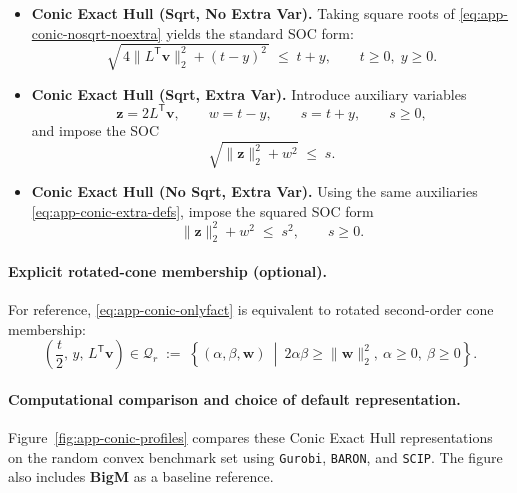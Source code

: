 \documentclass[11pt]{article}
\begin{document}
\begin{appendices}
\begin{itemize}
\item \textbf{Conic Exact Hull (Sqrt, No Extra Var).}
Taking square roots of \eqref{eq:app-conic-nosqrt-noextra} yields the standard SOC form:
\begin{equation}
\label{eq:app-conic-sqrt-noextra}
\sqrt{\,4\|L^{\mathsf T}\mathbf{v}\|_2^2 + (t-y)^2\,} \;\le\; t+y,
\qquad t\ge 0,\; y\ge 0.
\end{equation}

\item \textbf{Conic Exact Hull (Sqrt, Extra Var).}
Introduce auxiliary variables
\begin{equation}
\label{eq:app-conic-extra-defs}
\mathbf{z} = 2L^{\mathsf T}\mathbf{v},
\qquad
w = t-y,
\qquad
s = t+y,
\qquad
s \ge 0,
\end{equation}
and impose the SOC
\begin{equation}
\label{eq:app-conic-sqrt-extra}
\sqrt{\|\mathbf{z}\|_2^2 + w^2} \;\le\; s.
\end{equation}

\item \textbf{Conic Exact Hull (No Sqrt, Extra Var).}
Using the same auxiliaries \eqref{eq:app-conic-extra-defs}, impose the squared SOC form
\begin{equation}
\label{eq:app-conic-nosqrt-extra}
\|\mathbf{z}\|_2^2 + w^2 \;\le\; s^2,
\qquad s\ge 0.
\end{equation}
\end{itemize}

\paragraph{Explicit rotated-cone membership (optional).}
For reference, \eqref{eq:app-conic-onlyfact} is equivalent to rotated second-order cone membership:
\[
\left(\frac{t}{2},\, y,\, L^{\mathsf T}\mathbf{v}\right)\in\mathcal{Q}_r
\;:=\;
\left\{(\alpha,\beta,\mathbf{w}) \ \middle|\ 2\alpha\beta \ge \|\mathbf{w}\|_2^2,\ \alpha\ge 0,\ \beta\ge 0\right\}.
\]

\paragraph{Computational comparison and choice of default representation.}
Figure~\ref{fig:app-conic-profiles} compares these Conic Exact Hull representations on the random convex
benchmark set using \texttt{Gurobi}, \texttt{BARON}, and \texttt{SCIP}. The figure also includes \textbf{BigM} as a baseline reference.


\end{appendices}
\end{document}
